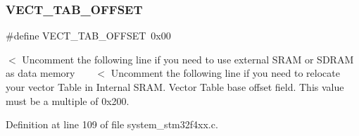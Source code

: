 \subsubsection{\texorpdfstring{V\+E\+C\+T\+\_\+\+T\+A\+B\+\_\+\+O\+F\+F\+S\+ET}{VECT\_TAB\_OFFSET}}
{\footnotesize\ttfamily \#define V\+E\+C\+T\+\_\+\+T\+A\+B\+\_\+\+O\+F\+F\+S\+ET~0x00}

$<$ Uncomment the following line if you need to use external S\+R\+AM or S\+D\+R\+AM as data memory ~\newline
~\newline
 $<$ Uncomment the following line if you need to relocate your vector Table in Internal S\+R\+AM. Vector Table base offset field. This value must be a multiple of 0x200. 

Definition at line 109 of file system\+\_\+stm32f4xx.\+c.

